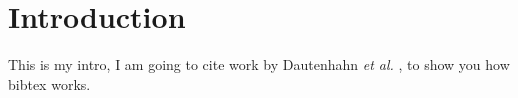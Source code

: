\section{Introduction}

This is my intro, I am going to cite work by Dautenhahn \emph{et al.}
\cite{Dautenhahn}, to show you how bibtex works.
